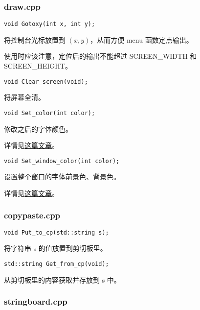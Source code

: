 \documentclass{article}
\begin{document}
    \subsubsection{draw.cpp}

    \begin{lstlisting}
void Gotoxy(int x, int y);
    \end{lstlisting}
    
    将控制台光标放置到 $(x,y)$，从而方便 menu 函数定点输出。

    使用时应该注意，定位后的输出不能超过 SCREEN\_WIDTH 和\newline SCREEN\_HEIGHT。

    \begin{lstlisting}
void Clear_screen(void);
    \end{lstlisting}

    将屏幕全清。

    \begin{lstlisting}
void Set_color(int color);
    \end{lstlisting}

    修改之后的字体颜色。

    详情见\textcolor{blue}{\href{https://blog.csdn.net/wangxun20081008/article/details/115046817}{这篇文章}}。

    \begin{lstlisting}
void Set_window_color(int color);
    \end{lstlisting}

    设置整个窗口的字体前景色、背景色。

    详情见\textcolor{blue}{\href{https://blog.csdn.net/wangxun20081008/article/details/115046817}{这篇文章}}。

    \subsubsection{copypaste.cpp}

    \begin{lstlisting}
void Put_to_cp(std::string s);
    \end{lstlisting}

    将字符串 s 的值放置到剪切板里。

    \begin{lstlisting}
std::string Get_from_cp(void);
    \end{lstlisting}

    从剪切板里的内容获取并存放到 s 中。

    \subsubsection{stringboard.cpp}
\end{document}
